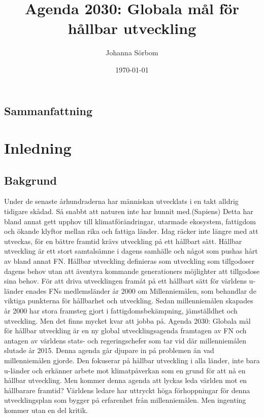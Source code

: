 \documentclass{report}
\title{Agenda 2030: Globala mål för hållbar utveckling}
\date{\today}
\author{Johanna Sörbom}
\begin{document}
\maketitle
\newpage
\begin{titlepage}
\section*{Sammanfattning}
\newpage
\tableofcontents
\end{titlepage}
\newpage
{}
\section{Inledning}
\subsection{Bakgrund}
Under de senaste århundraderna har människan utvecklats i en takt alldrig tidigare skådad.\cite{webWWF} Så snabbt att naturen inte har hunnit med.(Sapiens) Detta har bland annat gett upphov till klimatförändringar, utarmade ekosystem, fattigdom och ökande klyftor mellan rika och fattiga länder.\cite{webWWF} Idag räcker inte längre med att utveckas, för en bättre framtid krävs utveckling på ett hållbart sätt. Hållbar utveckling är ett stort samtalsämne i dagens samhälle och något som pushas hårt av bland annat FN. Hållbar utveckling definieras som utveckling som tillgodoser dagens behov utan att äventyra kommande generationers möjlighter att tillgodose sina behov.\cite{web2030agenda}
För att driva utvecklingen framåt på ett hållbart sätt för världens u-länder enades FNs medlemsländer år 2000 om Millenniemålen, som behandlar de viktiga punkterna för hållbarhet och utveckling.  Sedan millenniemålen skapades år 2000 har stora framsteg gjort i fattigdomsbekämpning, jämställdhet och utveckling. Men det finns mycket kvar att jobba på. \cite{webEuropeanComission}
Agenda 2030: Globala mål för hållbar utveckling är en ny global utvecklingsagenda framtagen av FN och antagen av världens stats- och regeringschefer som tar vid där millenniemålen slutade år 2015. Denna agenda går djupare in på problemen än vad millenniemålen gjorde. Den fokuserar på hållbar utveckling i alla länder, inte bara u-länder och erkänner arbete mot klimatpåverkan som en grund för att nå en hållbar utveckling. Men kommer denna agenda att lyckas leda världen mot en hållbarare framtid? Världens ledare har uttryckt höga förhoppningar för denna utvecklingsplan som bygger på erfarenhet från millenniemålen. Men ingenting kommer utan en del kritik. 
\end{document}
